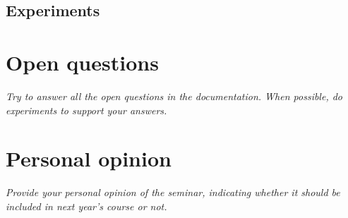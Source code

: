 \documentclass[a4paper, 10pt]{article}
\begin{document}
\subsection{Experiments}

\section{Open questions}

\textit{Try to answer all the open questions in the documentation. When possible, do experiments to support your answers.}

\section{Personal opinion}

\textit{Provide your personal opinion of the seminar, indicating whether it should be included in next year's course or not.}
\end{document}
